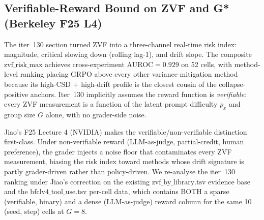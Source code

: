 
\subsection{Verifiable-Reward Bound on ZVF and G* (Berkeley F25 L4)}
\label{sec:zvf-verifiable}

The iter~130 section turned ZVF into a three-channel real-time risk
index: magnitude, critical slowing down (rolling lag-1), and drift
slope. The composite $\mathrm{zvf\_risk\_max}$ achieves cross-experiment
AUROC$=0.929$ on 52 cells, with method-level ranking placing
GRPO above every other variance-mitigation method because its
high-CSD + high-drift profile is the closest cousin of the
collapse-positive anchors. Iter~130 implicitly assumes the reward
function is \emph{verifiable}: every ZVF measurement is a function of
the latent prompt difficulty $p_x$ and group size $G$ alone, with no
grader-side noise.

Jiao's F25 Lecture 4 (NVIDIA) makes the verifiable/non-verifiable
distinction first-class. Under non-verifiable reward
(LLM-as-judge, partial-credit, human preference), the grader injects
a noise floor that contaminates every ZVF measurement, biasing the
risk index toward methods whose drift signature is partly
grader-driven rather than policy-driven. We re-analyse the
iter~130 ranking under Jiao's correction on the existing
$\mathrm{zvf\_by\_library.tsv}$ evidence base and the
$\mathrm{bfclv4\_tool\_use.tsv}$ per-cell data, which contains
BOTH a sparse (verifiable, binary) and a dense (LLM-as-judge)
reward column for the same 10 (seed, step) cells at $G=8$.

